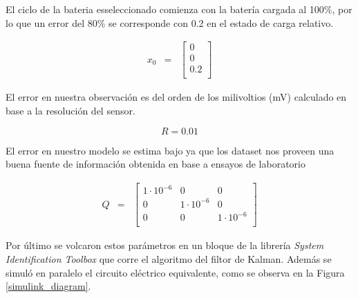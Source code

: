 \documentclass[10pt,a4paper]{article}
\begin{document}
\noindent El ciclo de la bateria esseleccionado comienza con la batería cargada
al 100\%, por lo que un error del 80\% se corresponde con 0.2 en el estado de
carga relativo.

\begin{equation}
    \begin{array}{llll}
	x_0 & = & \begin{bmatrix}
	    0 \\
	    0 \\
	    0.2 \\
	\end{bmatrix} 
    \end{array} \nonumber
\end{equation}

\noindent El error en nuestra observación es del orden de los milivoltios
(mV) calculado en base a la resolución del sensor.

\begin{equation}
    R = 0.01  \nonumber
\end{equation}

\noindent El error en nuestro modelo se estima bajo ya que los dataset nos 
proveen una buena fuente de información obtenida en base a ensayos de 
laboratorio

\begin{equation}
    \begin{array}{llll}
	Q & = & \begin{bmatrix}
	    1\cdot10^{-6} & 0 & 0 \\
	    0 & 1\cdot10^{-6} & 0 \\
	    0 & 0 & 1\cdot10^{-6} \\
	\end{bmatrix} 
    \end{array} \nonumber
\end{equation}

Por último se volcaron estos parámetros en un bloque de la librería \emph{System
Identification Toolbox} que corre el algoritmo del filtor de Kalman. Además se
simuló en paralelo el circuito eléctrico equivalente, como se observa en la
Figura \ref{simulink_diagram}.
\end{document}
